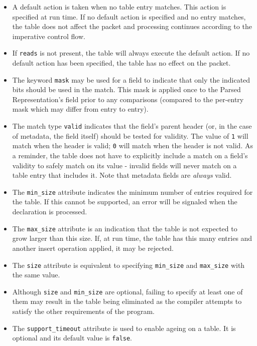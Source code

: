 \documentclass[12pt]{article}
\begin{document}
\begin{itemize}
\item
A default action is taken when no table entry matches.  This action is specified 
at run time. If no default action is specified and no entry matches, the table 
does not affect the packet and processing continues according to the imperative 
control flow.
\item
If \texttt{reads} is not present, the table will always execute the default action. 
If no default action has been specified, the table has no effect on the packet.
\item
The keyword \texttt{mask} may be used for a field to indicate that only the indicated 
bits should be used in the match. This mask is applied once to the Parsed 
Representation's field prior to any comparisons (compared to the per-entry 
mask which may differ from entry to entry).
\item
The match type \texttt{valid} indicates that the field's parent header (or, in the 
case of metadata, the field itself) should be tested for validity.  The value 
of \texttt{1} will match when the header is valid; \texttt{0} will match when the header is 
not valid. As a reminder, the table does not have to explicitly include a 
match on a field's validity to safely match on its value - invalid fields 
will never match on a table entry that includes it. Note that metadata fields 
are \textit{always} valid.
\item
The \texttt{min_size} attribute indicates the minimum number of entries required 
for the table. If this cannot be supported, an error will be signaled when 
the declaration is processed.
\item
The \texttt{max_size} attribute is an indication that the table is not expected to 
grow larger than this size. If, at run time, the table has this many entries 
and another insert operation applied, it may be rejected.
\item
The \texttt{size} attribute is equivalent to specifying \texttt{min_size} and \texttt{max_size} with 
the same value.
\item
Although \texttt{size} and \texttt{min_size} are optional, failing to specify at least one 
of them may result in the table being eliminated as the compiler attempts 
to satisfy the other requirements of the program.
\item
The \texttt{support_timeout} attribute is used to enable ageing on a table. It
is optional and its default value is \texttt{false}.
\end{itemize}
\end{document}
